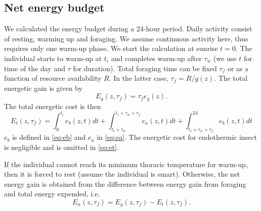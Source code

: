 \subsection*{Net energy budget}
We calculated  the energy budget during a 24-hour period.
Daily activity consist of resting, warming up and foraging.
We assume continuous activity here, thus requires only one warm-up phase.
We start the calculation at sunrise $t = 0$.
The individual starts to warm-up at $t_i$ and completes warm-up after $\tau_w$ (we use $t$ for time of the day and $\tau$ for duration).
Total foraging time can be fixed $\tau_f$ or as a function of resource availability $R$. 
In the latter case, $\tau_f = R/g(z)$.
The total energetic gain is given by
\[
	E_g(z,\tau_f) = \tau_f e_g(z).
\]
%
The total energetic cost is then
\begin{equation} \label{eq:et}
	E_t(z, \tau_f) = \int_0^{t_i} e_b(z, t) dt + \int_{t_i + \tau_w}^{t_i +\tau_w + \tau_f} e_a(z,t) dt + \int_{t_i+\tau_w+\tau_f}^{24} e_b(z, t) dt 
\end{equation}
$e_b$ is defined in \cref{eq:eb}  and $e_a$ in \cref{eq:ea}.
The energetic cost for endothermic insect is negligible and is omitted in \cref{eq:et}.

If the individual cannot reach its minimum thoracic temperature for warm-up, then it is forced to rest (assume the individual is smart).
Otherwise, the net energy gain is obtained from the  difference between energy gain from foraging and total energy expended, i.e.
\[ 
	E_n(z, \tau_f) = E_g(z,\tau_f) - E_t(z, \tau_f).
\]


